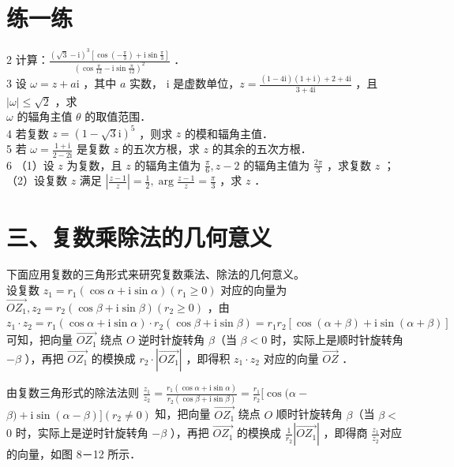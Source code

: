 \documentclass[10pt]{article}
\begin{document}
\section*{练一练}
2 计算：\(\frac{(\sqrt{3}-\mathrm{i})^{3}\left[\cos \left(-\frac{\pi}{3}\right)+\mathrm{i} \sin \frac{\pi}{3}\right]}{\left(\cos \frac{\pi}{12}-\mathrm{i} \sin \frac{\pi}{12}\right)^{2}}\) ．\\
3 设 \(\omega=z+a \mathrm{i}\) ，其中 \(a\) 实数， i 是虚数单位，\(z=\frac{(1-4 \mathrm{i})(1+\mathrm{i})+2+4 \mathrm{i}}{3+4 \mathrm{i}}\) ，且 \(|\omega| \leqslant \sqrt{2}\) ，求\\
\(\omega\) 的辐角主值 \(\theta\) 的取值范围．\\
4 若复数 \(z=(1-\sqrt{3} \mathrm{i})^{5}\) ，则求 \(z\) 的模和辐角主值．\\
5 若 \(\omega=\frac{1+\mathrm{i}}{2-2 \mathrm{i}}\) 是复数 \(z\) 的五次方根，求 \(z\) 的其余的五次方根．\\
6 （1）设 \(z\) 为复数，且 \(z\) 的辐角主值为 \(\frac{\pi}{6}, z-2\) 的辐角主值为 \(\frac{2 \pi}{3}\) ，求复数 \(z\) ；\\
（2）设复数 \(z\) 满足 \(\left|\frac{z-1}{z}\right|=\frac{1}{2}, \arg \frac{z-1}{z}=\frac{\pi}{3}\) ，求 \(z\) ．

\section*{三、复数乘除法的几何意义}
下面应用复数的三角形式来研究复数乘法、除法的几何意义。\\
设复数 \(z_{1}=r_{1}(\cos \alpha+\mathrm{i} \sin \alpha)\left(r_{1} \geqslant 0\right)\) 对应的向量为 \(\overrightarrow{O Z_{1}}, z_{2}=r_{2}(\cos \beta+\mathrm{i} \sin \beta)\left(r_{2} \geqslant 0\right)\) ，由 \(z_{1} \cdot z_{2}=r_{1}(\cos \alpha+\mathrm{i} \sin \alpha) \cdot r_{2}(\cos \beta+\mathrm{i} \sin \beta)=r_{1} r_{2}[\cos (\alpha+\beta)+\mathrm{i} \sin (\alpha+\beta)]\) 可知，把向量 \(\overrightarrow{O Z_{1}}\) 绕点 \(O\) 逆时针旋转角 \(\beta\)（当 \(\beta<0\) 时，实际上是顺时针旋转角 \(-\beta\) ），再把 \(\overrightarrow{O Z_{1}}\) 的模换成 \(r_{2} \cdot\left|\overrightarrow{O Z_{1}}\right|\) ，即得积 \(z_{1} \cdot z_{2}\) 对应的向量 \(\overrightarrow{O Z}\) ．

由复数三角形式的除法法则 \(\frac{z_{1}}{z_{2}}=\frac{r_{1}(\cos \alpha+\mathrm{i} \sin \alpha)}{r_{2}(\cos \beta+\mathrm{i} \sin \beta)}=\frac{r_{1}}{r_{2}}[\cos (\alpha-\) \(\beta)+\mathrm{i} \sin (\alpha-\beta)]\left(r_{2} \neq 0\right)\) 知，把向量 \(\overrightarrow{O Z_{1}}\) 绕点 \(O\) 顺时针旋转角 \(\beta\)（当 \(\beta<\) 0 时，实际上是逆时针旋转角 \(-\beta\) ），再把 \(\overrightarrow{O Z_{1}}\) 的模换成 \(\frac{1}{r_{2}}\left|\overrightarrow{O Z_{1}}\right|\) ，即得商 \(\frac{z_{1}}{z_{2}}\)对应的向量，如图 8－12 所示．
\end{document}
